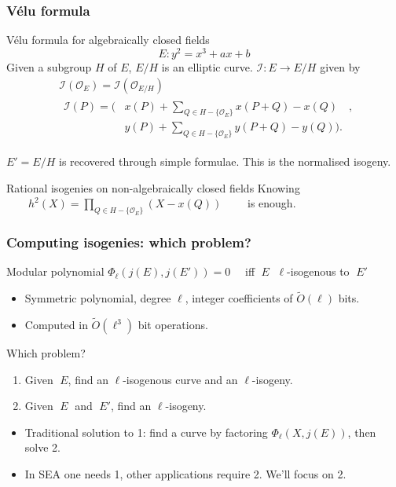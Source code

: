 \documentclass[10pt]{beamer}
\newcommand{\0}{\mathcal{O}}  %
\newcommand{\isog}[1]{\mathcal{#1}}  %
\newcommand{\I}{\isog{I}}  %
\newcommand{\tildO}{\tilde{O}}  %
\begin{document}
\begin{frame}
  \frametitle{Vélu formula}
  
  \begin{block}{Vélu formula for algebraically closed fields}
    \[E : y^2 = x^3 + ax + b\]
    Given a subgroup $H$ of $E$, $E/H$ is an elliptic curve. $\I:E\rightarrow E/H$ given by
    \begin{align*}
      &\I(\0_E) = \I(\0_{E/H})\\
      &\begin{aligned}
        \I(P) = \Biggl( &x(P) + \sum_{Q\in H - \{\0_E\}}x(P+Q) - x(Q) \quad,\\
        &y(P) + \sum_{Q\in H - \{\0_E\}}y(P+Q) - y(Q) \Biggr) \text{.}
      \end{aligned}
    \end{align*}

    $E'=E/H$ is recovered through simple formulae. This is the
    normalised isogeny.
  \end{block}

  \begin{block}{Rational isogenies on non-algebraically closed fields}
    \centering Knowing $\qquad h^2(X) = \prod_{Q\in H-\{\0_E\}}\left(X
    - x(Q)\right)\qquad$ is enough.
  \end{block}
\end{frame}


\begin{frame}
  \frametitle{Computing isogenies: which problem?}

  \begin{block}{Modular polynomial}
    \centering
    $\Phi_\ell(j(E),j(E')) = 0\quad$ iff $\;E\;$ $\ell$-isogenous to $\;E'\;$

    \begin{itemize}
    \item Symmetric polynomial, degree $\ell$, integer coefficients of
      $\tildO(\ell)$ bits.
    \item Computed in $\tildO(\ell^3)$ bit operations.
    \end{itemize}
  \end{block}

  \begin{block}{Which problem?}
    \begin{enumerate}
    \item Given $\;E$, find an $\ell$-isogenous curve and an $\ell$-isogeny.
    \item Given $\;E\;$ and $\;E'$, find an $\ell$-isogeny.
    \end{enumerate}
    \begin{itemize}
    \item Traditional solution to 1: find a curve by factoring
      $\Phi_\ell(X,j(E))$, then solve 2.
    \item In SEA one needs 1, other applications require 2. We'll
      focus on 2.
    \end{itemize}
  \end{block}
\end{frame}
\end{document}

